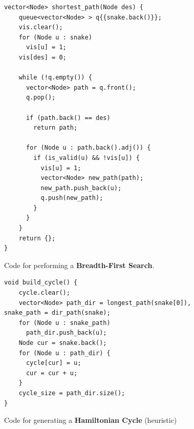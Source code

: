 \documentclass[12pt]{article}
\begin{document}
\begin{figure}[!h]
\centering
\begin{lstlisting}
vector<Node> shortest_path(Node des) {
    queue<vector<Node> > q{{snake.back()}};
    vis.clear();
    for (Node u : snake)
      vis[u] = 1;
    vis[des] = 0;
    
    while (!q.empty()) {
      vector<Node> path = q.front();
      q.pop();
     
      if (path.back() == des)
        return path;
        
      for (Node u : path.back().adj()) {
        if (is_valid(u) && !vis[u]) {
          vis[u] = 1;
          vector<Node> new_path(path);
          new_path.push_back(u);
          q.push(new_path);
        }
      }
    }
    return {};
}
\end{lstlisting}
\caption{Code for performing a \textbf{Breadth-First Search}.}
\label{fig:bfs_code}
\end{figure}

\begin{figure}[!h]
\begin{lstlisting}
void build_cycle() {
    cycle.clear();
    vector<Node> path_dir = longest_path(snake[0]), snake_path = dir_path(snake);
    for (Node u : snake_path)
      path_dir.push_back(u);
    Node cur = snake.back();
    for (Node u : path_dir) {
      cycle[cur] = u;
      cur = cur + u;
    }
    cycle_size = path_dir.size();
}
\end{lstlisting}
\caption{Code for generating a \textbf{Hamiltonian Cycle} (heuristic) \cite{liu2019}}
\label{fig:cycle_code}
\end{figure}
\end{document}
